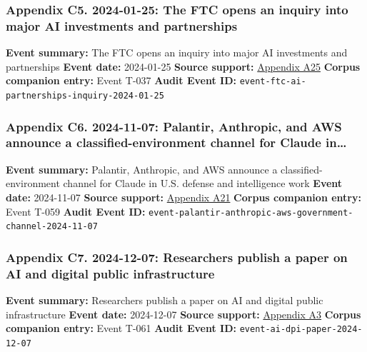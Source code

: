 \documentclass[
  american,
  11pt,
  letterpaper,
]{article}
\begin{document}
\subsubsection{Appendix C5. 2024-01-25: The FTC opens an inquiry into
major AI investments and
partnerships}\label{ch-10-appendix-c5-2024-01-25-the-ftc-opens-an-inquiry-into-major-ai-investments-and-partnerships}

\textbf{Event summary:} The FTC opens an inquiry into major AI
investments and partnerships \textbf{Event date:} 2024-01-25
\textbf{Source support:}
\hyperref[ch-10-appendix-a25-ftc-opens-inquiry-into-big-tech-s-partnerships-with-leading-ai-startups]{Appendix
A25} \textbf{Corpus companion entry:} Event T-037 \textbf{Audit Event
ID:} \texttt{event-ftc-ai-partnerships-inquiry-2024-01-25}

\subsubsection{Appendix C6. 2024-11-07: Palantir, Anthropic, and AWS
announce a classified-environment channel for Claude
in\ldots{}}\label{ch-10-appendix-c6-2024-11-07-palantir-anthropic-and-aws-announce-a-classified-environment-channel-for-claude-in-u-s-defense-and-intelligence-work}

\textbf{Event summary:} Palantir, Anthropic, and AWS announce a
classified-environment channel for Claude in U.S. defense and
intelligence work \textbf{Event date:} 2024-11-07 \textbf{Source
support:}
\hyperref[ch-10-appendix-a21-anthropic-and-palantir-partner-to-bring-claude-ai-models-to-aws-for-u-s-government-intelligence-and-defense-operations]{Appendix
A21} \textbf{Corpus companion entry:} Event T-059 \textbf{Audit Event
ID:} \texttt{event-palantir-anthropic-aws-government-channel-2024-11-07}

\subsubsection{Appendix C7. 2024-12-07: Researchers publish a paper on
AI and digital public
infrastructure}\label{ch-10-appendix-c7-2024-12-07-researchers-publish-a-paper-on-ai-and-digital-public-infrastructure}

\textbf{Event summary:} Researchers publish a paper on AI and digital
public infrastructure \textbf{Event date:} 2024-12-07 \textbf{Source
support:}
\hyperref[ch-10-appendix-a3-interactions-between-artificial-intelligence-and-digital-public-infrastructure-concepts-benefits-and-challenges]{Appendix
A3} \textbf{Corpus companion entry:} Event T-061 \textbf{Audit Event
ID:} \texttt{event-ai-dpi-paper-2024-12-07}
\end{document}
